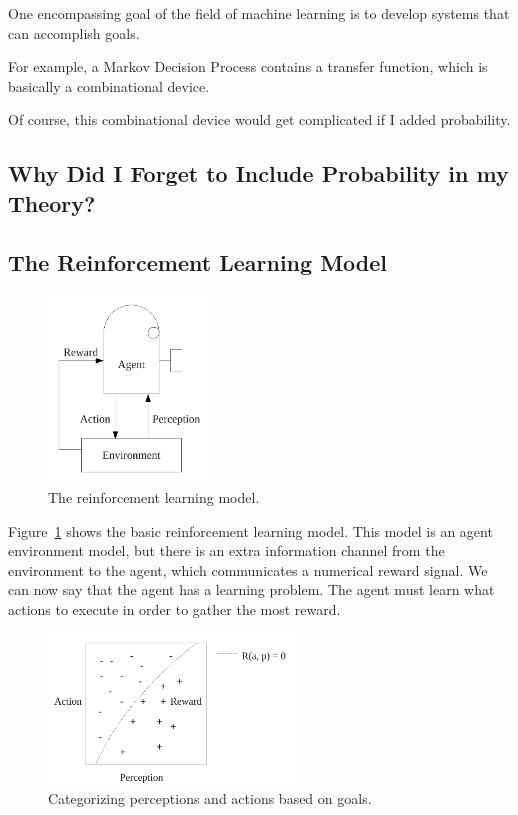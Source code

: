 One encompassing goal of the field of machine learning is to develop
systems that can accomplish goals.

For example, a Markov Decision Process contains a transfer function,
which is basically a combinational device.

Of course, this combinational device would get complicated if I added probability.



\subsection{Why Did I Forget to Include Probability in my Theory?}



\subsection{The Reinforcement Learning Model}

\begin{figure}[bth]
  \center
  \includegraphics[height=5cm]{gfx/reinforcement_learning}
  \caption[The reinforcement learning model]{The reinforcement learning model.}
  \label{fig:reinforcement_learning}
\end{figure}

Figure~\ref{fig:reinforcement_learning} shows the basic reinforcement
learning model.  This model is an agent environment model, but there
is an extra information channel from the environment to the agent,
which communicates a numerical reward signal.  We can now say that the
agent has a learning problem.  The agent must learn what actions to
execute in order to gather the most reward.

\begin{figure}[bth]
  \center
  \includegraphics[height=4cm]{gfx/perception_categorization}
  \caption[Categorizing perceptions and actions based on goals]{Categorizing perceptions and actions based on goals.}
  \label{fig:perception_categorization}
\end{figure}

